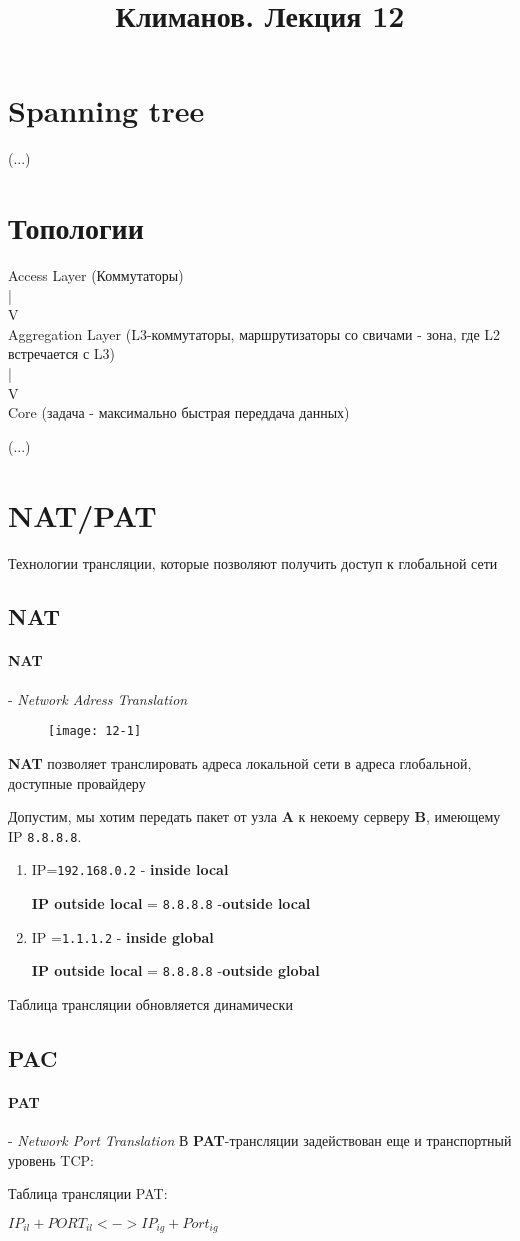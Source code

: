 \documentclass[a4paper,10pt]{article}
\title{Климанов. Лекция 12}
\begin{document}
	\maketitle
	\section{Spanning tree}
	(...)
	\section{Топологии} 
	Access Layer (Коммутаторы)\\
	|\\
	V\\
	Aggregation Layer (L3-коммутаторы, маршрутизаторы со свичами - зона, где L2 встречается с L3)\\
	|\\
	V\\
	Core (задача - максимально быстрая переддача данных)
	
	(...)
	\section{NAT/PAT}
	Технологии трансляции, которые позволяют получить доступ к глобальной сети 
	\subsection{NAT}
	\paragraph{NAT} - \emph{Network Adress Translation}
	
	\begin{figure}[h]
		\texttt{[image: 12-1]}
	\end{figure}
	\textbf{NAT} позволяет транслировать адреса локальной сети в адреса глобальной, доступные провайдеру
	
	Допустим, мы хотим передать пакет от узла \textbf{A} к некоему серверу \textbf{B}, имеющему IP \texttt{8.8.8.8}.
	\begin{enumerate}
		\item IP=\texttt{192.168.0.2} - \textbf{inside local}
		
	\textbf{IP outside local }= \texttt{8.8.8.8} -\textbf{outside local}
		\item IP =\texttt{1.1.1.2} - \textbf{inside global}
		
	 \textbf{IP outside local} = \texttt{8.8.8.8} -\textbf{outside global}
	\end{enumerate}
	Таблица трансляции обновляется динамически
	
	\subsection{PAC}
	\paragraph{PAT} - \emph{Network Port Translation}
	В \textbf{PAT}-трансляции задействован еще и транспортный уровень TCP:
	
	Таблица трансляции PAT: 
	
	$ IP_{il}+PORT_{il} <->IP_{ig}+Port_{ig} $
\end{document}
